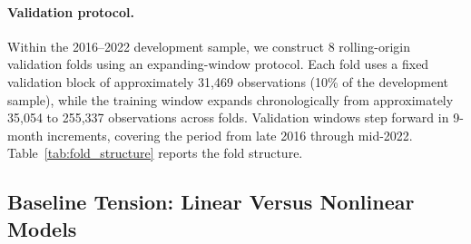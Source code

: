 \documentclass{article}
\theoremstyle{plain}
\theoremstyle{definition}
\newcommand{\1}{\mathbf{1}}
\begin{document}
\paragraph{Validation protocol.} Within the 2016--2022 development sample, we construct 8 rolling-origin validation folds using an expanding-window protocol. Each fold uses a fixed validation block of approximately 31{,}469 observations (10\% of the development sample), while the training window expands chronologically from approximately 35{,}054 to 255{,}337 observations across folds. Validation windows step forward in 9-month increments, covering the period from late 2016 through mid-2022. Table~\ref{tab:fold_structure} reports the fold structure.

\begin{table}[!ht]
\centering
\caption{Rolling-origin validation fold structure. Training windows expand chronologically; validation blocks are of fixed size.}
\label{tab:fold_structure}
\end{table}

\subsection{Baseline Tension: Linear Versus Nonlinear Models}
\end{document}

